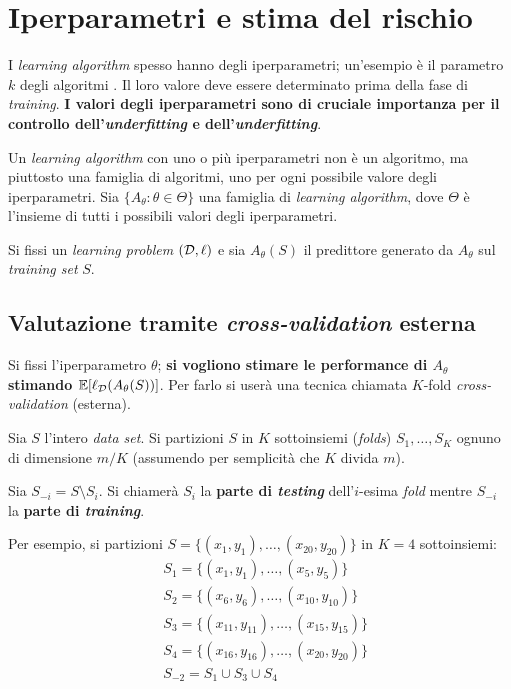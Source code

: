 \section{Iperparametri e stima del rischio}

I \textit{learning algorithm} spesso hanno degli iperparametri; un'esempio è il
parametro $k$ degli algoritmi \kNN. Il loro valore deve essere determinato prima
della fase di \textit{training}. \textbf{I valori degli iperparametri sono di 
cruciale importanza per il controllo dell'\textit{underfitting} e
dell'\textit{underfitting}}.

Un \textit{learning algorithm} con uno o più iperparametri non è un algoritmo, ma
piuttosto una famiglia di algoritmi, uno per ogni possibile valore degli
iperparametri. Sia $\{A_\theta : \theta \in \Theta\}$ una famiglia di
\textit{learning algorithm}, dove $\Theta$ è l'insieme di tutti i possibili valori
degli iperparametri.

Si fissi un \textit{learning problem} $(\mathcal{D},\ell)$ e sia $A_\theta(S)$ il
predittore generato da $A_\theta$ sul \textit{training set} $S$.

\subsection{Valutazione tramite \textit{cross-validation} esterna}
Si fissi l'iperparametro $\theta$; \textbf{si vogliono stimare le performance di 
$A_\theta$ stimando $\mathbb{E}[\ell_{\mathcal{D}}(A_\theta(S))]$}. Per farlo si userà una tecnica
chiamata $K$-fold \textit{cross-validation} (esterna).

Sia $S$ l'intero \textit{data set}. Si partizioni $S$ in $K$ sottoinsiemi
(\textit{folds}) $S_1,\dots,S_K$ ognuno di dimensione $m/K$ (assumendo per
semplicità che $K$ divida $m$).

Sia $S_{-i} = S \setminus S_i$. Si chiamerà $S_i$ la
\textbf{parte di \textit{testing}} dell'$i$-esima \textit{fold} mentre $S_{-i}$
la \textbf{parte di \textit{training}}.

Per esempio, si partizioni $S=\{(x_1,y_1),\dots,(x_{20},y_{20})\}$ in $K=4$
sottoinsiemi:
$$\begin{aligned}
    &S_1 = \{(x_1,y_1),\dots,(x_{5},y_{5})\} \\
    &S_2 = \{(x_6,y_6),\dots,(x_{10},y_{10})\} \\
    &S_3 = \{(x_{11},y_{11}),\dots,(x_{15},y_{15})\} \\
    &S_4 = \{(x_{16},y_{16}),\dots,(x_{20},y_{20})\} \\
    &S_{-2} = S_1 \cup S_3 \cup S_4
\end{aligned}$$

